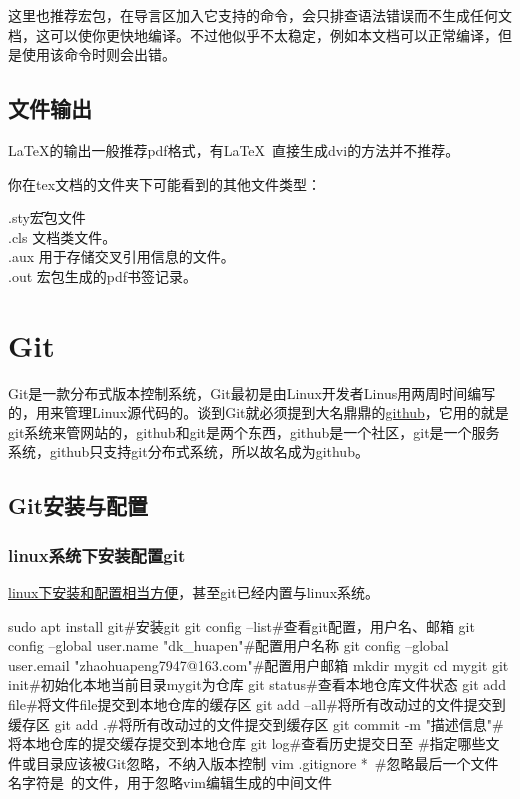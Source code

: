 	这里也推荐宏包，在导言区加入它支持的命令，会只排查语法错误而不生成任何文档，这可以使你更快地编译。不过他似乎不太稳定，例如本文档可以正常编译，但是使用该命令时则会出错。
\subsection{文件输出}
	\LaTeX{}的输出一般推荐pdf格式，有\LaTeX\ 直接生成dvi的方法并不推荐。

你在tex文档的文件夹下可能看到的其他文件类型：
\begin{tabbing}
	.sty{\hspace{2em}}\=宏包文件\\%
	.cls	\> 文档类文件。\\
	.aux	\> 用于存储交叉引用信息的文件。\\
	.out	\> 宏包生成的pdf书签记录。
\end{tabbing}
\section{Git}
	Git是一款分布式版本控制系统，Git最初是由Linux开发者Linus用两周时间编写的，用来管理Linux源代码的。谈到Git就必须提到大名鼎鼎的\href{https://github.com/}{github}，它用的就是git系统来管网站的，github和git是两个东西，github是一个社区，git是一个服务系统，github只支持git分布式系统，所以故名成为github。
\subsection{Git安装与配置}
\subsubsection{linux系统下安装配置git}
\href{https://blog.csdn.net/bjbz_cxy/article/details/116703787?spm=1001.2014.3001.5506}{linux下安装和配置相当方便}，甚至git已经内置与linux系统。

\begin{shell}
sudo apt install git#安装git
git config --list#查看git配置，用户名、邮箱
git config --global user.name "dk_huapen"#配置用户名称
git config --global user.email "zhaohuapeng7947@163.com"#配置用户邮箱
mkdir mygit
cd mygit
git init#初始化本地当前目录mygit为仓库
git status#查看本地仓库文件状态
git add file#将文件file提交到本地仓库的缓存区
git add --all#将所有改动过的文件提交到缓存区
git add .#将所有改动过的文件提交到缓存区
git commit -m "描述信息"#将本地仓库的提交缓存提交到本地仓库
git log#查看历史提交日至
#指定哪些文件或目录应该被Git忽略，不纳入版本控制
vim .gitignore
*~#忽略最后一个文件名字符是~的文件，用于忽略vim编辑生成的中间文件
\end{shell}
